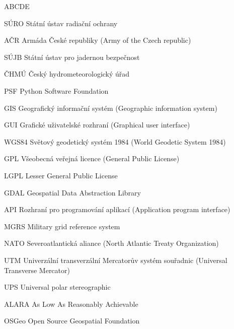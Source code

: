 
\begin{seznamzkratek}{ABCDE}

	      {SÚRO}
	      {Státní ústav radiační ochrany}
	      
	     {AČR}
	     {Armáda České republiky (Army of the Czech republic)}	  
	     
	      {SÚJB}
	      {Státní ústav pro jadernou bezpečnost}
	      
	      {ČHMÚ}
	      {Český hydrometeorologický úřad}	         
	      
		  {PSF}
	      {Python Software Foundation}

	      {GIS}
	      {Geografický informační systém (Geographic information system)}
	         
	      {GUI}
	      {Grafické uživatelské rozhraní (Graphical user interface)}
	           
	      {WGS84}
	      {Světový geodetický systém 1984 (World Geodetic System 1984)}

	      {GPL}
	      {Všeobecná veřejná licence (General Public License)}
	      
	      {LGPL}
	      {Lesser General Public License}	      
	      
	      {GDAL}
	      {Geospatial Data Abstraction Library}
	      
	      {API}
	      {Rozhraní pro programování aplikací (Application program interface)}	      
	    
	      {MGRS}
	      {Military grid reference system}
	      
	      {NATO}
	      {Severoatlantická aliance (North Atlantic Treaty Organization)}
	      
	      {UTM}
	      {Univerzální transverzální Mercatorův systém souřadnic (Universal Transverse Mercator)}	
	      
	      {UPS}
	      {Universal polar stereographic}	
	      
	      {ALARA}
	      {As Low As Reasonably Achievable}     
	      
	      {OSGeo}
	      {Open Source Geospatial Foundation} 
	      

\end{seznamzkratek}
